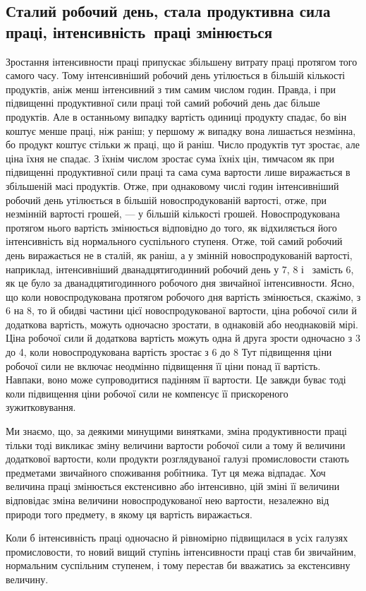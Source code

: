 
\manualpagebreak{}
\subsection{Сталий робочий день, стала продуктивна сила праці,
інтенсивність~праці змінюється}

Зростання інтенсивности праці припускає збільшену витрату
праці протягом того самого часу. Тому інтенсивніший робочий
день утілюється в більшій кількості продуктів, аніж менш
інтенсивний з тим самим числом годин. Правда, і при підвищенні
продуктивної сили праці той самий робочий день дає
більше продуктів. Але в останньому випадку вартість одиниці
продукту спадає, бо він коштує менше праці, ніж раніш; у першому
ж випадку вона лишається незмінна, бо продукт коштує
стільки ж праці, що й раніш. Число продуктів тут зростає, але
ціна їхня не спадає. З їхнім числом зростає сума їхніх цін, тимчасом
як при підвищенні продуктивної сили праці та сама сума
вартости лише виражається в збільшеній масі продуктів. Отже,
при однаковому числі годин інтенсивніший робочий день утілюється
в більшій новоспродукованій вартості, отже, при незмінній
вартості грошей, — у більшій кількості грошей. Новоспродукована
протягом нього вартість змінюється відповідно до того,
як відхиляється його інтенсивність від нормального суспільного
ступеня. Отже, той самий робочий день виражається не в сталій,
як раніш, а у змінній новоспродукованій вартості, наприклад,
інтенсивніший дванадцятигодинний робочий день у 7,
8 і~ замість 6, як це було за дванадцятигодинного
робочого дня звичайної інтенсивности. Ясно, що коли
новоспродукована протягом робочого дня вартість змінюється,
скажімо, з 6 на 8, то й обидві частини цієї
новоспродукованої вартости, ціна робочої сили й додаткова вартість,
можуть одночасно зростати, в однаковій або неоднаковій
мірі. Ціна робочої сили й додаткова вартість можуть одна й друга
зрости одночасно з 3 до 4, коли новоспродукована вартість
зростає з 6 до 8 Тут підвищення ціни робочої
сили не включає неодмінно підвищення її ціни понад її вартість.
Навпаки, воно може супроводитися падінням її вартости. Це
завжди буває тоді коли підвищення ціни робочої сили не компенсує
її прискореного зужитковування.

Ми знаємо, що, за деякими минущими винятками, зміна
продуктивности праці тільки тоді викликає зміну величини вартости
робочої сили а тому й величини додаткової вартости, коли
продукти розглядуваної галузі промисловости стають предметами
звичайного споживання робітника. Тут ця межа відпадає.
Хоч величина праці змінюється екстенсивно або інтенсивно, цій
зміні її величини відповідає зміна величини новоспродукованої
нею вартости, незалежно від природи того предмету, в якому
ця вартість виражається.

Коли б інтенсивність праці одночасно й рівномірно підвищилася
в усіх галузях промисловости, то новий вищий ступінь інтенсивности
праці став би звичайним, нормальним суспільним ступенем,
і тому перестав би вважатись за екстенсивну величину.
\parbreak{}  %
